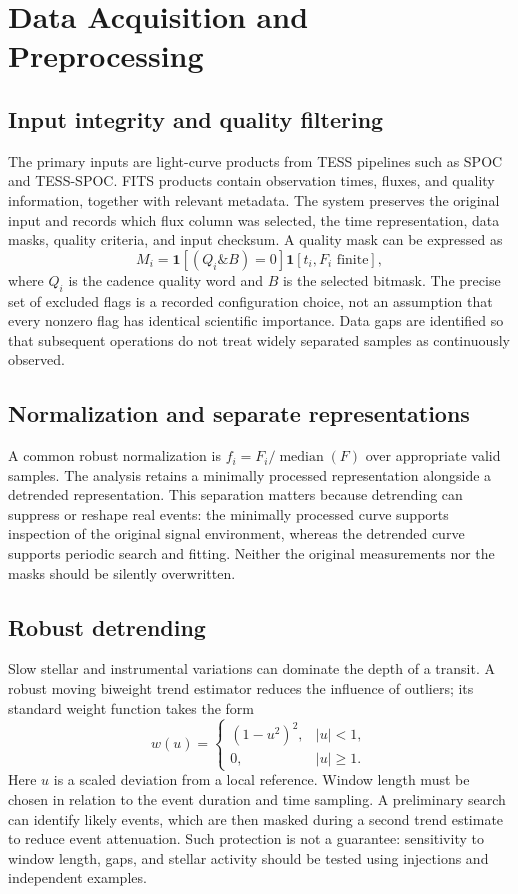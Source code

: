 \documentclass[11pt,a4paper]{article}
\begin{document}
\section{Data Acquisition and Preprocessing}
\subsection{Input integrity and quality filtering}
The primary inputs are light-curve products from TESS pipelines such as SPOC and TESS-SPOC. FITS products contain observation times, fluxes, and quality information, together with relevant metadata. The system preserves the original input and records which flux column was selected, the time representation, data masks, quality criteria, and input checksum. A quality mask can be expressed as
\begin{equation}
M_i=\mathbf{1}\!\left[(Q_i\mathbin{\&}B)=0\right]\mathbf{1}[t_i,F_i\text{ finite}],
\end{equation}
where $Q_i$ is the cadence quality word and $B$ is the selected bitmask. The precise set of excluded flags is a recorded configuration choice, not an assumption that every nonzero flag has identical scientific importance. Data gaps are identified so that subsequent operations do not treat widely separated samples as continuously observed.

\subsection{Normalization and separate representations}
A common robust normalization is $f_i=F_i/\operatorname{median}(F)$ over appropriate valid samples. The analysis retains a minimally processed representation alongside a detrended representation. This separation matters because detrending can suppress or reshape real events: the minimally processed curve supports inspection of the original signal environment, whereas the detrended curve supports periodic search and fitting. Neither the original measurements nor the masks should be silently overwritten.

\subsection{Robust detrending}
Slow stellar and instrumental variations can dominate the depth of a transit. A robust moving biweight trend estimator reduces the influence of outliers; its standard weight function takes the form
\begin{equation}
w(u)=\begin{cases}(1-u^2)^2,&|u|<1,\\0,&|u|\ge 1.\end{cases}
\end{equation}
Here $u$ is a scaled deviation from a local reference. Window length must be chosen in relation to the event duration and time sampling. A preliminary search can identify likely events, which are then masked during a second trend estimate to reduce event attenuation. Such protection is not a guarantee: sensitivity to window length, gaps, and stellar activity should be tested using injections and independent examples.
\end{document}
